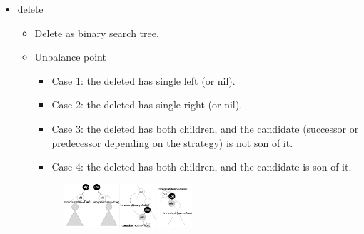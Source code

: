 \documentclass[twocolumn]{article}
\begin{document}
\begin{itemize}
  \item delete
    \begin{itemize}
    \item Delete as binary search tree.
    \item Unbalance point
      \begin{itemize}
      \item Case 1: the deleted has single left (or nil).
      \item Case 2: the deleted has single right (or nil).
      \item Case 3: the deleted has both children, and the candidate (successor or predecessor depending on the strategy) is not son of it.
      \item Case 4: the deleted has both children, and the candidate is son of it.
      \end{itemize}
      \begin{figure}[H]
      \centering
      \includegraphics[width=0.48\textwidth]{assets/avl-ubp}
      \end{figure}

    \end{itemize}
\end{itemize}

\end{document}
